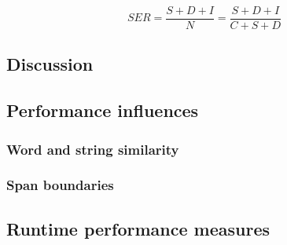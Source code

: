 \begin{displaymath}
	SER = \frac{S+D+I}{N} = \frac{S+D+I}{C+S+D}
\end{displaymath}

\subsection{Discussion}

\subsection{Performance influences}

\subsubsection{Word and string similarity}
\subsubsection{Span boundaries}

\subsection{Runtime performance measures}